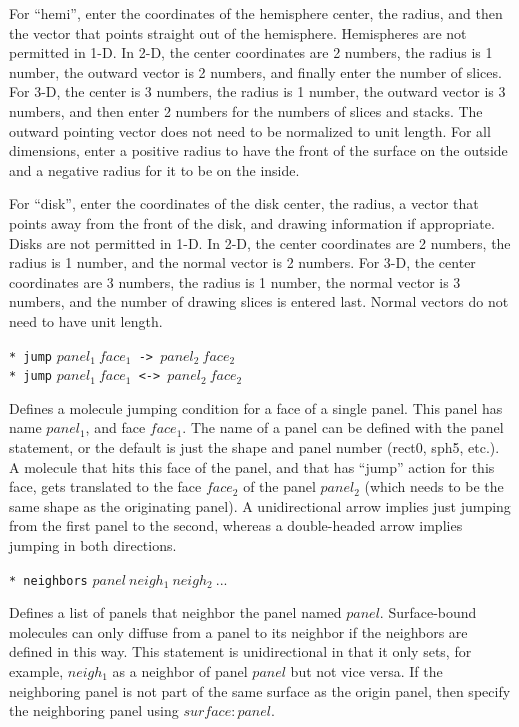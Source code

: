 \documentclass {scrbook}
\newcommand {\ttt} {\texttt}
\begin{document}
\begin{description}
For ``hemi'', enter the coordinates of the hemisphere center, the radius, and then the vector that points straight out of the hemisphere. Hemispheres are not permitted in 1-D. In 2-D, the center coordinates are 2 numbers, the radius is 1 number, the outward vector is 2 numbers, and finally enter the number of slices. For 3-D, the center is 3 numbers, the radius is 1 number, the outward vector is 3 numbers, and then enter 2 numbers for the numbers of slices and stacks. The outward pointing vector does not need to be normalized to unit length. For all dimensions, enter a positive radius to have the front of the surface on the outside and a negative radius for it to be on the inside.

For ``disk'', enter the coordinates of the disk center, the radius, a vector that points away from the front of the disk, and drawing information if appropriate. Disks are not permitted in 1-D. In 2-D, the center coordinates are 2 numbers, the radius is 1 number, and the normal vector is 2 numbers. For 3-D, the center coordinates are 3 numbers, the radius is 1 number, the normal vector is 3 numbers, and the number of drawing slices is entered last. Normal vectors do not need to have unit length.

\item{\ttt{* jump} $panel_1\ face_1$\ttt{ -> }$panel_2\ face_2$\\
\ttt{* jump} $panel_1\ face_1$\ttt{ <-> }$panel_2\ face_2$}

Defines a molecule jumping condition for a face of a single panel. This panel has name $panel_1$, and face $face_1$. The name of a panel can be defined with the panel statement, or the default is just the shape and panel number (rect0, sph5, etc.). A molecule that hits this face of the panel, and that has ``jump'' action for this face, gets translated to the face $face_2$ of the panel $panel_2$ (which needs to be the same shape as the originating panel). A unidirectional arrow implies just jumping from the first panel to the second, whereas a double-headed arrow implies jumping in both directions.

\item{\ttt{* neighbors} $panel\ neigh_1\ neigh_2\ ...$}

Defines a list of panels that neighbor the panel named $panel$. Surface-bound molecules can only diffuse from a panel to its neighbor if the neighbors are defined in this way. This statement is unidirectional in that it only sets, for example, $neigh_1$ as a neighbor of panel $panel$ but not vice versa. If the neighboring panel is not part of the same surface as the origin panel, then specify the neighboring panel using $surface:panel$.


\end{description}
\end{document}
